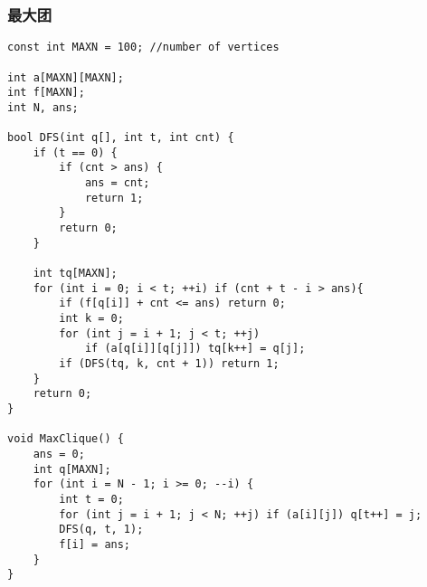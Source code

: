 \subsubsection{最大团}
\begin{verbatim}
const int MAXN = 100; //number of vertices

int a[MAXN][MAXN];
int f[MAXN];
int N, ans;

bool DFS(int q[], int t, int cnt) {
    if (t == 0) {
        if (cnt > ans) {
            ans = cnt;
            return 1;
        }
        return 0;
    }

    int tq[MAXN];
	for (int i = 0; i < t; ++i) if (cnt + t - i > ans){
        if (f[q[i]] + cnt <= ans) return 0;
        int k = 0;
        for (int j = i + 1; j < t; ++j)
            if (a[q[i]][q[j]]) tq[k++] = q[j];
        if (DFS(tq, k, cnt + 1)) return 1;
    }
    return 0;
}

void MaxClique() {
    ans = 0;
    int q[MAXN];
    for (int i = N - 1; i >= 0; --i) {
        int t = 0;
        for (int j = i + 1; j < N; ++j) if (a[i][j]) q[t++] = j;
        DFS(q, t, 1);
        f[i] = ans;
    }
}
\end{verbatim}
